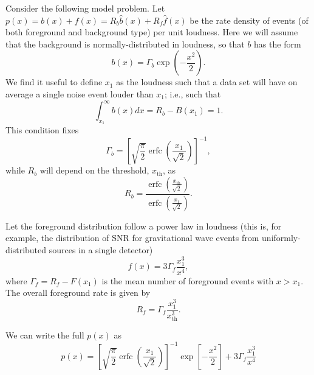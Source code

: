\documentclass[aps,prd,reprint,nofootinbib]{revtex4-1}
\DeclareMathOperator{\erfc}{erfc}
\begin{document}
Consider the following model problem.  Let $p(x) = b(x) + f(x) = R_b
\hat{b}(x) + R_f \hat{f}(x)$ be the rate density of events (of both
foreground and background type) per unit loudness.  Here we will
assume that the background is normally-distributed in loudness, so
that $b$ has the form
\begin{equation}
b(x) = \Gamma_b \exp \left(- \frac{x^2}{2} \right).
\end{equation}
We find it useful to define $x_1$ as the loudness such that a data set
will have on average a single noise event louder than $x_1$; i.e.,
such that 
\begin{equation}
 \int_{x_1}^{\infty} b(x) dx = R_b - B\left(x_1\right) = 1.
\end{equation}
This condition fixes 
\begin{equation}
  \Gamma_b = \left[ \sqrt{\frac{\pi}{2}} \erfc\left(
    \frac{x_1}{\sqrt{2}} \right) \right]^{-1},
\end{equation}
while $R_b$ will depend on the threshold, $x_\mathrm{th}$, as 
\begin{equation}
  R_b = \frac{\erfc\left( \frac{x_\mathrm{th}}{\sqrt{2}}
    \right)}{\erfc\left( \frac{x_1}{\sqrt{2}} \right)}.
\end{equation}

Let the foreground distribution follow a power law in loudness (this
is, for example, the distribution of SNR for gravitational wave events
from uniformly-distributed sources in a single detector)
\begin{equation}
\label{eq:ps}
f(x) = 3 \Gamma_f \frac{x_1^3}{x^4},
\end{equation}
where $\Gamma_f = R_f - F\left(x_1\right)$ is the mean number of
foreground events with $x > x_1$.  The overall foreground rate is
given by 
\begin{equation}
  \label{eq:foreground-from-lambda}
  R_f = \Gamma_f \frac{x_1^3}{x_\mathrm{th}^3}.
\end{equation}

We can write the full $p(x)$ as
\begin{equation}
\label{eq:ptot} 
p(x) = \left[\sqrt{\frac{\pi}{2}}
  \erfc\left(\frac{x_1}{\sqrt{2}}\right)\right]^{-1}\exp\left[-\frac{x^2}{2}\right]
+ 3 \Gamma_f \frac{x_1^3}{x^4}
\end{equation}
\end{document}
